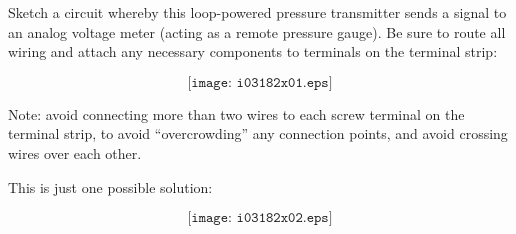 

Sketch a circuit whereby this loop-powered pressure transmitter sends a signal to an analog voltage meter (acting as a remote pressure gauge).  Be sure to route all wiring and attach any necessary components to terminals on the terminal strip:

\vskip 50pt

$$\texttt{[image: i03182x01.eps]}$$

Note: avoid connecting more than two wires to each screw terminal on the terminal strip, to avoid ``overcrowding'' any connection points, and avoid crossing wires over each other.







This is just one possible solution:

$$\texttt{[image: i03182x02.eps]}$$











